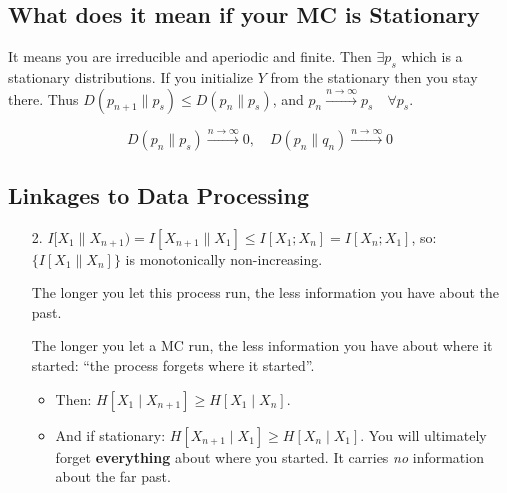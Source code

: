 \subsection{What does it mean if your MC is Stationary}
It means you are irreducible and aperiodic and finite. Then $\exists p_s$ which is a stationary distributions. If you initialize $Y$ from the stationary then you stay there. Thus $D(p_{n+1}\| p_{s})\leq D(p_{n}\| p_{s})$, and $p_n\stackrel{n\to\infty}\to p_s\quad\forall p_s$.

\begin{equation}
    D(p_n\| p_{s}) \stackrel{n\to\infty}\to 0, \quad
    D(p_n\| q_{n}) \stackrel{n\to\infty}\to 0
\end{equation}

\subsection{Linkages to Data Processing}
\begin{enumerate}
    \item[2.] $I[X_{1} \| X_{n+1}) = I[X_{n+1} \| X_{1}] \leq I[X_1; X_n]=I[X_n; X_1]$, so: $\{I[X_1\|X_n]\}$ is monotonically non-increasing.

The longer you let this process run, the less information you have about the past.

The longer you let a MC run, the less information you have about where it started: ``the process forgets where it started''.
    \begin{itemize}
        \item Then: $H[X_1\mid X_{n+1}] \geq H[X_1\mid X_{n}]$.
        \item And if stationary: $H[X_{n+1} \mid X_1] \geq H[X_n \mid X_1]$. You will ultimately forget \textbf{everything} about where you started. It carries \textit{no} information about the far past.
    \end{itemize}
\end{enumerate}

